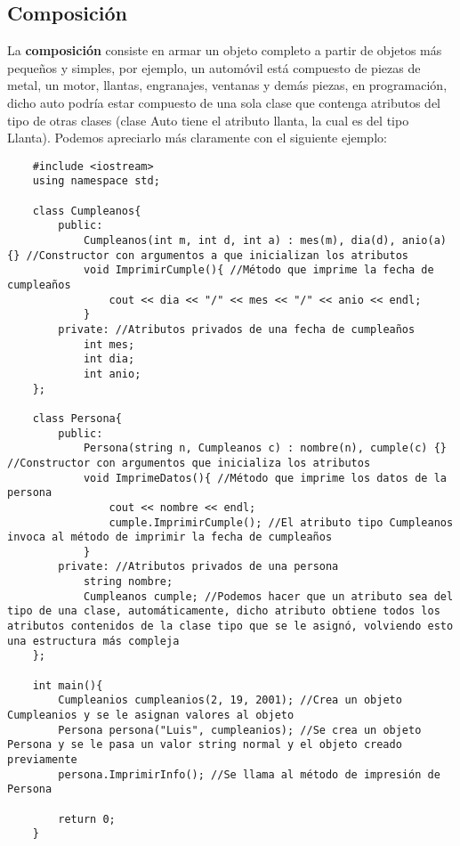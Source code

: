 \subsection{Composición}
\hspace{0.55cm}La \textbf{composición} consiste en armar un objeto completo a partir de objetos más pequeños y simples, por ejemplo, un automóvil está compuesto de piezas de metal, un motor, llantas, engranajes, ventanas y demás piezas, en programación, dicho auto podría estar compuesto de una sola clase que contenga atributos del tipo de otras clases (clase Auto tiene el atributo llanta, la cual es del tipo Llanta). Podemos apreciarlo más claramente con el siguiente ejemplo:
\begin{lstlisting}
    #include <iostream>
    using namespace std;

    class Cumpleanos{
        public:
            Cumpleanos(int m, int d, int a) : mes(m), dia(d), anio(a) {} //Constructor con argumentos a que inicializan los atributos
            void ImprimirCumple(){ //Método que imprime la fecha de cumpleaños
                cout << dia << "/" << mes << "/" << anio << endl;
            }
        private: //Atributos privados de una fecha de cumpleaños
            int mes;
            int dia;
            int anio;
    };
    
    class Persona{
        public:
            Persona(string n, Cumpleanos c) : nombre(n), cumple(c) {} //Constructor con argumentos que inicializa los atributos
            void ImprimeDatos(){ //Método que imprime los datos de la persona
                cout << nombre << endl;
                cumple.ImprimirCumple(); //El atributo tipo Cumpleanos invoca al método de imprimir la fecha de cumpleaños
            }
        private: //Atributos privados de una persona
            string nombre;
            Cumpleanos cumple; //Podemos hacer que un atributo sea del tipo de una clase, automáticamente, dicho atributo obtiene todos los atributos contenidos de la clase tipo que se le asignó, volviendo esto una estructura más compleja
    };
    
    int main(){
        Cumpleanios cumpleanios(2, 19, 2001); //Crea un objeto Cumpleanios y se le asignan valores al objeto
        Persona persona("Luis", cumpleanios); //Se crea un objeto Persona y se le pasa un valor string normal y el objeto creado previamente
        persona.ImprimirInfo(); //Se llama al método de impresión de Persona
    
        return 0;
    }
\end{lstlisting}

